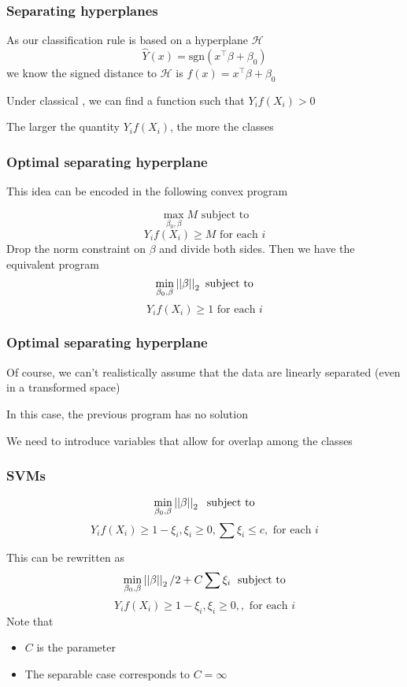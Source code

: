 \documentclass[12pt]{beamer}
\begin{document}
\begin{frame}
\frametitle{Separating hyperplanes}
As our classification rule is based on a hyperplane $\mathcal{H}$
\[
\hat{Y}(x) = \textrm{sgn}(x^{\top}\beta + \beta_0)
\]
we know the signed distance to $\mathcal{H}$ is $f(x) = x^{\top}\beta + \beta_0$

\vsp
Under classical , we can find a function such that $Y_i f(X_i) > 0$ 

\vsp

The larger the quantity $Y_if(X_i)$, the more  the classes
\end{frame}

\begin{frame}
\frametitle{Optimal separating hyperplane}
This idea can be encoded in the following convex program

\[
\max_{\beta_0,\beta} M \textrm{ subject to}
\]
\[
Y_if(X_i) \geq M \textrm{ for each } i
\]
Drop the norm constraint on $\beta$ and divide both sides.  Then we have the equivalent program
\[
\min_{\beta_0,\beta} \left|\left| \beta \right|\right|_2 \textrm{ subject to}
\]
\[
Y_if(X_i) \geq 1 \textrm{ for each } i
\]
\end{frame}

\begin{frame}
\frametitle{Optimal separating hyperplane}
Of course, we can't realistically assume that the data are linearly separated (even in a transformed space)

\vsp
In this case, the previous program has no  solution

\vsp
We need to introduce  variables that allow for overlap among the classes
\end{frame}

\begin{frame}
\frametitle{SVMs}
\[
\min_{\beta_0,\beta} \left|\left| \beta \right|\right|_2 \; \textrm{ subject to}
\]
\[
Y_if(X_i) \geq 1  - \xi_i, \xi_i \geq 0, \sum \xi_i \leq c, \textrm{ for each } i
\]

\vsp
This can be rewritten as
\[
\min_{\beta_0,\beta} \left|\left| \beta \right|\right|_2/2 + C\sum \xi_i \; \textrm{ subject to}
\]
\[
Y_if(X_i) \geq 1  - \xi_i, \xi_i \geq 0, , \textrm{ for each } i
\]
Note that
\begin{itemize}
\item  $C$ is the   parameter
\item The separable case corresponds to  $C=\infty$
\end{itemize}
\end{frame}
\end{document}
